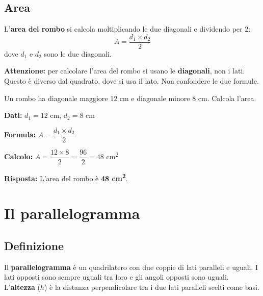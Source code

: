 \subsection{Area}

\begin{regola}
    L'\textbf{area del rombo} si calcola moltiplicando le due diagonali e dividendo per 2:
    \[
        A = \frac{d_1 \times d_2}{2}
    \]
    dove $d_1$ e $d_2$ sono le due diagonali.
\end{regola}

\begin{attenzione}
    \textbf{Attenzione:} per calcolare l'area del rombo si usano le \textbf{diagonali}, non i lati. Questo è diverso dal quadrato, dove si usa il lato. Non confondere le due formule.
\end{attenzione}

\begin{esempio}
    Un rombo ha diagonale maggiore 12 cm e diagonale minore 8 cm. Calcola l'area.

    \medskip
    \textbf{Dati:} $d_1 = 12$ cm, $d_2 = 8$ cm

    \textbf{Formula:} $A = \dfrac{d_1 \times d_2}{2}$

    \textbf{Calcolo:} $A = \dfrac{12 \times 8}{2} = \dfrac{96}{2} = 48$ cm\textsuperscript{2}

    \textbf{Risposta:} L'area del rombo è \textbf{48 cm\textsuperscript{2}}.
\end{esempio}

\section{Il parallelogramma}

\subsection{Definizione}

\begin{definizione}
    Il \textbf{parallelogramma} è un quadrilatero con due coppie di lati paralleli e uguali. I lati opposti sono sempre uguali tra loro e gli angoli opposti sono uguali. L'\textbf{altezza} ($h$) è la distanza perpendicolare tra i due lati paralleli scelti come basi.
\end{definizione}

\begin{center}
\end{center}

